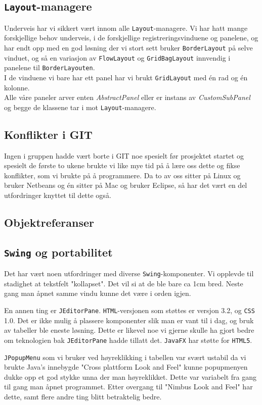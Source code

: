 \subsection{\texttt{Layout}-managere}
Underveis har vi sikkert vært innom alle \texttt{Layout}-managere. Vi har hatt mange forskjellige behov underveis, i de forskjellige registreringsvinduene og panelene, og har endt opp med en god løsning der vi stort sett bruker \texttt{BorderLayout} på selve vinduet, og så en variasjon av \texttt{FlowLayout} og \texttt{GridBagLayout} innvendig i panelene til \texttt{BorderLayouten}. \\
I de vinduene vi bare har ett panel har vi brukt \texttt{GridLayout} med én rad og én kolonne. \\
Alle våre paneler arver enten \emph{AbstractPanel} eller er instans av \emph{CustomSubPanel} og begge de klassene tar i mot \texttt{Layout}-managere.

\subsection{Konflikter i GIT}
Ingen i gruppen hadde vært borte i GIT noe spesielt før prosjektet startet og spesielt de første to ukene brukte vi like mye tid på å lære oss dette og fikse konflikter, som vi brukte på å programmere. Da to av oss sitter på Linux og bruker Netbeans og én sitter på Mac og bruker Eclipse, så har det vært en del utfordringer knyttet til dette også.
\subsection{Objektreferanser}
\subsection{\texttt{Swing} og portabilitet}
Det har vært noen utfordringer med diverse \texttt{Swing}-komponenter. Vi opplevde til stadighet at tekstfelt "kollapset". Det vil si at de ble bare ca 1cm bred. Neste gang man åpnet samme vindu kunne det være i orden igjen. 

En annen ting er \texttt{JEditorPane}. \texttt{HTML}-versjonen som støttes er versjon 3.2, og \texttt{CSS} 1.0. 
Det er ikke mulig å plassere komponenter slik man er vant til i dag, og bruk av tabeller ble eneste løsning. Dette er likevel noe vi gjerne skulle ha gjort bedre om teknologien bak \texttt{JEditorPane} hadde tillatt det. \texttt{JavaFX} har støtte for \texttt{HTML5}.

\texttt{JPopupMenu} som vi bruker ved høyreklikking i tabellen var svært ustabil da vi brukte Java's innebygde "Cross plattform Look and Feel" kunne popupmenyen dukke opp et god stykke unna der man høyreklikket. Dette var variabelt fra gang til gang man åpnet programmet. Etter overgang til "Nimbus Look and Feel" har dette, samt flere andre ting blitt betraktelig bedre.


